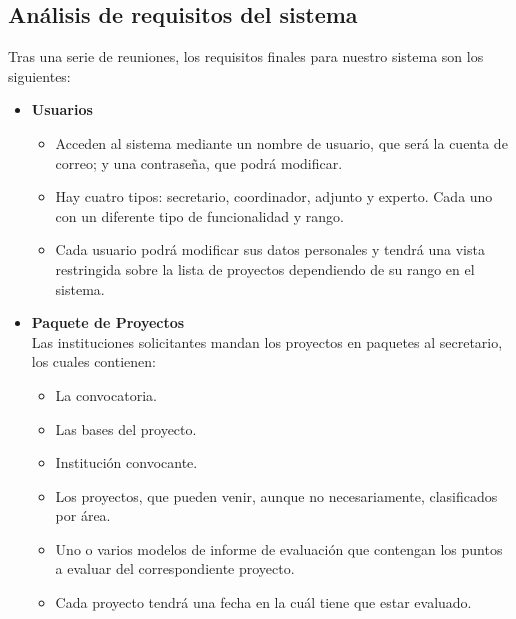 \documentclass[12pt,a4paper,spanish,twoside]{article}
\begin{document}
\subsection{Análisis de requisitos del sistema}
Tras una serie de reuniones, los requisitos finales para nuestro sistema son los siguientes:
\begin{itemize}

\item \textbf{Usuarios}
\begin{itemize}
\item Acceden al sistema mediante un nombre de usuario, que será la cuenta de correo; y una 
contraseña, que podrá modificar.
\item Hay cuatro tipos: secretario, coordinador, adjunto y experto. Cada uno con un diferente 
tipo de funcionalidad y rango.
\item Cada usuario podrá modificar sus datos personales y tendrá una vista restringida sobre la 
lista de proyectos dependiendo de su rango en el sistema.
\end{itemize}

\item \textbf{Paquete de Proyectos}
\\Las instituciones solicitantes mandan los proyectos en paquetes al secretario, los cuales 
contienen:
\begin{itemize}
\item La convocatoria.
\item Las bases del proyecto.
\item Institución convocante.
\item Los proyectos, que pueden venir, aunque no necesariamente, clasificados por área.
\item Uno o varios modelos de informe de evaluación que contengan los puntos a evaluar del 
correspondiente proyecto. 
\item Cada proyecto tendrá una fecha en la cuál tiene que estar evaluado.
\end{itemize}


\end{itemize}
\end{document}
